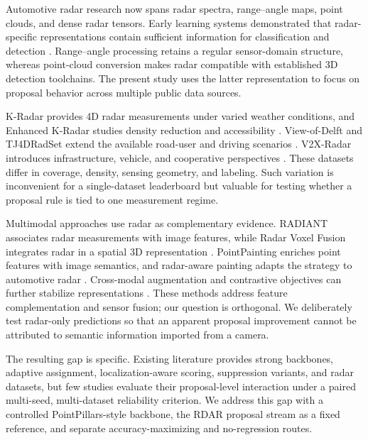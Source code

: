 \documentclass[preprint,12pt,times]{elsarticle}
\begin{document}
Automotive radar research now spans radar spectra, range--angle maps, point
clouds, and dense radar tensors. Early learning systems demonstrated that
radar-specific representations contain sufficient information for
classification and detection \cite{patel2019radarspectra,wang2021rodnet}.
Range--angle processing retains a regular sensor-domain structure, whereas
point-cloud conversion makes radar compatible with established 3D detection
toolchains. The present study uses the latter representation to focus on
proposal behavior across multiple public data sources.

K-Radar provides 4D radar measurements under varied weather conditions, and
Enhanced K-Radar studies density reduction and accessibility
\cite{paek2022kradar,paek2023enhancedkradar}. View-of-Delft and TJ4DRadSet
extend the available road-user and driving scenarios
\cite{palffy2022viewofdelft,zheng2022tj4dradset}. V2X-Radar introduces
infrastructure, vehicle, and cooperative perspectives
\cite{yang2024v2xradar}. These datasets differ in coverage, density, sensing
geometry, and labeling. Such variation is inconvenient for a single-dataset
leaderboard but valuable for testing whether a proposal rule is tied to one
measurement regime.

Multimodal approaches use radar as complementary evidence. RADIANT associates
radar measurements with image features, while Radar Voxel Fusion integrates
radar in a spatial 3D representation
\cite{long2023radiant,nobis2021radarvoxelfusion}. PointPainting enriches point
features with image semantics, and radar-aware painting adapts the strategy to
automotive radar \cite{vora2020pointpainting,montiel2024pointcloudpainting}.
Cross-modal augmentation and contrastive objectives can further stabilize
representations \cite{deng2024crossmodal,zhang2024contrastiveradar}. These
methods address feature complementation and sensor fusion; our question is
orthogonal. We deliberately test radar-only predictions so that an apparent
proposal improvement cannot be attributed to semantic information imported
from a camera.

The resulting gap is specific. Existing literature provides strong backbones,
adaptive assignment, localization-aware scoring, suppression variants, and
radar datasets, but few studies evaluate their proposal-level interaction
under a paired multi-seed, multi-dataset reliability criterion. We address
this gap with a controlled PointPillars-style backbone, the RDAR proposal
stream as a fixed reference, and separate accuracy-maximizing and
no-regression routes.
\end{document}
